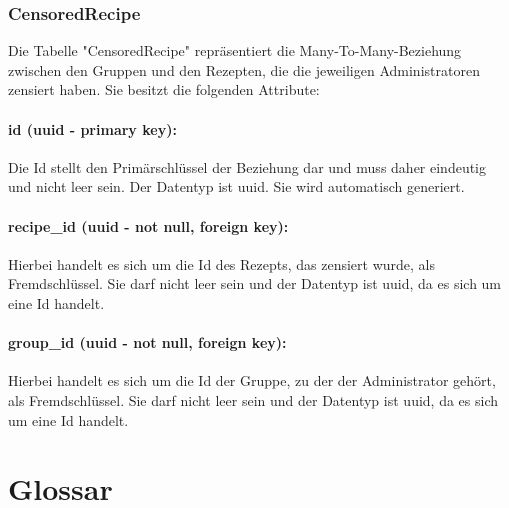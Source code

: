 \documentclass[parskip=full]{scrartcl}
\begin{document}
\subsubsection{CensoredRecipe}
Die Tabelle "CensoredRecipe" repräsentiert die Many-To-Many-Beziehung zwischen den Gruppen und den Rezepten, die die jeweiligen Administratoren zensiert haben. Sie besitzt die folgenden Attribute:
\paragraph{id (uuid - primary key):} Die Id stellt den Primärschlüssel der Beziehung dar und muss daher eindeutig und nicht leer sein. Der Datentyp ist \Gls{uuid}. Sie wird automatisch generiert.
\paragraph{recipe\_id (uuid - not null, foreign key):} Hierbei handelt es sich um die Id des Rezepts, das zensiert wurde, als Fremdschlüssel. Sie darf nicht leer sein und der Datentyp ist \Gls{uuid}, da es sich um eine Id handelt.
\paragraph{group\_id (uuid - not null, foreign key):} Hierbei handelt es sich um die Id der Gruppe, zu der der Administrator gehört, als Fremdschlüssel. Sie darf nicht leer sein und der Datentyp ist \Gls{uuid}, da es sich um eine Id handelt.
\newpage
\section{Glossar}
\printglossary[style=altlist]
\end{document}
